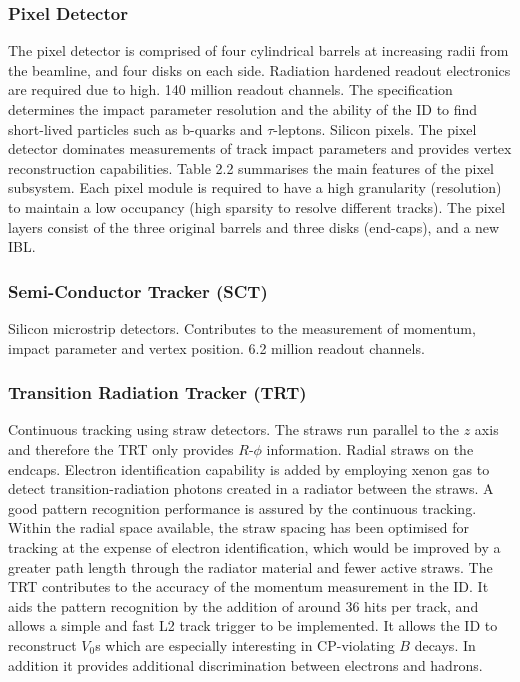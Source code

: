 \subsubsection{Pixel Detector}
The pixel detector is comprised of four cylindrical barrels at increasing radii from the beamline, and four disks on each side.
Radiation hardened readout electronics are required due to high. 
140 million readout channels. 
The specification determines the impact parameter resolution and the ability of the ID to find short-lived particles such as b-quarks and $\tau$-leptons.
Silicon pixels.
The pixel detector dominates measurements of track impact parameters and provides vertex reconstruction capabilities.
Table 2.2 summarises the main features of the pixel subsystem.
Each pixel module is required to have a high granularity (resolution) to maintain a low occupancy (high sparsity to resolve different tracks).
The pixel layers consist of the three original barrels and three disks (end-caps), and a new IBL.

\subsubsection{Semi-Conductor Tracker (SCT)}
Silicon microstrip detectors. Contributes to the measurement of momentum, impact parameter and vertex position.
6.2 million readout channels.

\subsubsection{Transition Radiation Tracker (TRT)}
Continuous tracking using straw detectors. The straws run parallel to the $z$ axis and therefore the TRT only provides $R$\nobreakdash-$\phi$ information. Radial straws on the endcaps. Electron identification capability is added by employing xenon gas to detect transition-radiation photons created in a radiator between the straws. A good pattern recognition performance is assured by the continuous tracking. Within the radial space available, the straw spacing has been optimised for tracking at the expense of electron
identification, which would be improved by a greater path length through the radiator material and fewer active straws. The TRT contributes to the accuracy of the momentum measurement in the ID. It aids the pattern recognition by the addition of around 36 hits per track, and allows a simple and fast L2 track trigger to be implemented. It allows the ID to reconstruct $V_0$s which are especially interesting in CP-violating $B$ decays. In addition it provides additional discrimination between electrons and hadrons.



